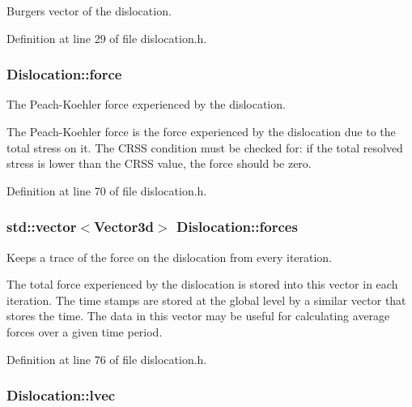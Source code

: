\-Burgers vector of the dislocation. 



\-Definition at line 29 of file dislocation.\-h.

\hypertarget{classDislocation_a9c19c7493d896bd845c489e1ec3cbbb6}{
\subsubsection[{force}]{ {\bf \-Dislocation\-::force}}}\label{d3/dc6/classDislocation_a9c19c7493d896bd845c489e1ec3cbbb6}


\-The \-Peach-\/\-Koehler force experienced by the dislocation. 

\-The \-Peach-\/\-Koehler force is the force experienced by the dislocation due to the total stress on it. \-The \-C\-R\-S\-S condition must be checked for\-: if the total resolved stress is lower than the \-C\-R\-S\-S value, the force should be zero. 

\-Definition at line 70 of file dislocation.\-h.

\hypertarget{classDislocation_aa8f4567bbfc6a58aaad01d5c423658c1}{
\subsubsection[{forces}]{\setlength{\rightskip}{0pt plus 5cm}std\-::vector$<${\bf \-Vector3d}$>$ {\bf \-Dislocation\-::forces}}}\label{d3/dc6/classDislocation_aa8f4567bbfc6a58aaad01d5c423658c1}


\-Keeps a trace of the force on the dislocation from every iteration. 

\-The total force experienced by the dislocation is stored into this vector in each iteration. \-The time stamps are stored at the global level by a similar vector that stores the time. \-The data in this vector may be useful for calculating average forces over a given time period. 

\-Definition at line 76 of file dislocation.\-h.

\hypertarget{classDislocation_a69d16092777d9ead2d4eedf7c3d47877}{
\subsubsection[{lvec}]{ {\bf \-Dislocation\-::lvec}}}\label{d3/dc6/classDislocation_a69d16092777d9ead2d4eedf7c3d47877}


